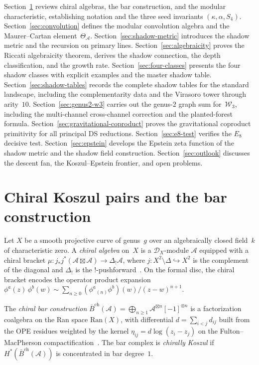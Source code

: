 \documentclass[11pt,reqno]{amsart}
\theoremstyle{definition}
\theoremstyle{remark}
\newcommand{\cA}{\mathcal{A}}
\newcommand{\barB}{\bar{B}}
\newcommand{\Ran}{\mathrm{Ran}}
\newcommand{\cW}{\mathcal{W}}
\numberwithin{equation}{section}
\begin{document}
Section~\ref{sec:background} reviews chiral algebras, the bar
construction, and the modular characteristic, establishing
notation and the three seed invariants
$(\kappa, \alpha, S_4)$.
Section~\ref{sec:convolution} defines the modular convolution
algebra and the Maurer--Cartan element~$\Theta_\cA$.
Section~\ref{sec:shadow-metric} introduces the shadow
metric and the recursion on primary lines.
Section~\ref{sec:algebraicity} proves the Riccati algebraicity
theorem, derives the shadow connection, the depth
classification, and the growth rate.
Section~\ref{sec:four-classes} presents the four shadow
classes with explicit examples and the master shadow table.
Section~\ref{sec:shadow-tables} records the complete shadow
tables for the standard landscape, including the
complementarity data and the Virasoro tower through arity~$10$.
Section~\ref{sec:genus2-w3} carries out the genus-$2$ graph sum
for~$\cW_3$, including the multi-channel cross-channel correction
and the planted-forest formula.
Section~\ref{sec:gravitational-coproduct} proves the gravitational
coproduct primitivity for all principal DS reductions.
Section~\ref{sec:e8-test} verifies the $E_8$ decisive test.
Section~\ref{sec:epstein} develops the Epstein zeta function
of the shadow metric and the shadow field construction.
Section~\ref{sec:outlook} discusses the descent fan, the
Koszul--Epstein frontier, and open problems.



\section{Chiral Koszul pairs and the bar construction}
\label{sec:background}

Let $X$ be a smooth projective curve of genus~$g$ over an
algebraically closed field~$k$ of characteristic zero.
A \emph{chiral algebra} on~$X$ is a $\mathcal{D}_X$-module
$\cA$ equipped with a chiral bracket
$\mu \colon j_* j^* (\cA \boxtimes \cA)
\to \Delta_! \cA$, where $j \colon X^2 \setminus \Delta
\hookrightarrow X^2$ is the complement of the diagonal and
$\Delta_!$ is the $!$-pushforward~\cite{BD04}. On the formal
disc, the chiral bracket encodes the operator product expansion
$\phi^a(z)\,\phi^b(w) \sim \sum_{n \ge 0}
(\phi^a{}_{(n)}\phi^b)(w)/(z-w)^{n+1}$.

The \emph{chiral bar construction}
$\barB^{\mathrm{ch}}(\cA) = \bigoplus_{n \ge 1}
\cA^{\boxtimes n}[-1]^{\otimes n}$ is a factorization coalgebra
on the Ran space $\Ran(X)$, with differential
$d = \sum_{i < j} d_{ij}$ built from the OPE residues
weighted by the kernel $\eta_{ij} = d\log(z_i - z_j)$ on the
Fulton--MacPherson compactification~\cite{FG12, CG17}.
The bar complex is \emph{chirally Koszul} if
$H^*(\barB^{\mathrm{ch}}(\cA))$ is concentrated in bar
degree~$1$.
\end{document}
